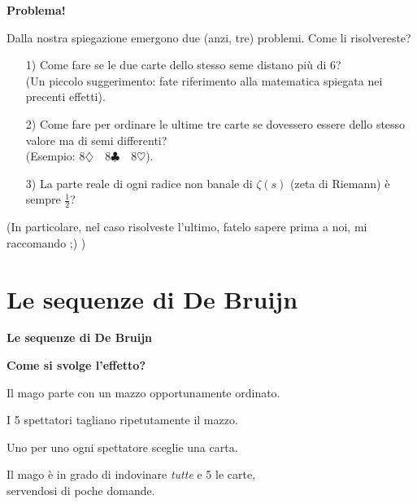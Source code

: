 \documentclass[8pt]{beamer}
\theoremstyle{plain}
\theoremstyle{definition}
\begin{document}
\begin{frame}
\begin{center}
\textbf{Problema!}

\medskip
\medskip

Dalla nostra spiegazione emergono due (anzi, tre) problemi. Come li risolvereste? 

\begin{itemize}
\item[1)] Come fare se le due carte dello stesso seme distano più di 6? \\(Un piccolo suggerimento: fate riferimento alla matematica spiegata nei precenti effetti).
\item[2)] Come fare per ordinare le ultime tre carte se dovessero essere dello stesso valore ma di semi differenti? \\(Esempio: $8\diamondsuit\quad 8\clubsuit\quad 8\heartsuit$).
\item[3)]  La parte reale di ogni radice non banale di $\zeta(s)$ (zeta di Riemann) è sempre $\frac{1}{2}$? 
\end{itemize}

\bigskip
\bigskip
\bigskip
\bigskip
\bigskip



(In particolare, nel caso risolveste l'ultimo, fatelo sapere prima a noi, mi raccomando ;) )
\end{center}
\end{frame}
% 
% 



\section{Le sequenze di De Bruijn}
\begin{frame}
\begin{center}
\textbf{Le sequenze di De Bruijn}
\end{center}
\end{frame}


\begin{frame}
\begin{center}
\textbf{Come si svolge l'effetto?}

\bigskip
\bigskip

Il mago parte con un mazzo opportunamente ordinato.

\smallskip

I 5 spettatori tagliano ripetutamente il mazzo.

\smallskip

Uno per uno ogni spettatore sceglie una carta.

\smallskip

Il mago è in grado di indovinare \textit{tutte} e 5 le carte, \\servendosi di poche domande.

\end{center}
\end{frame}
\end{document}
